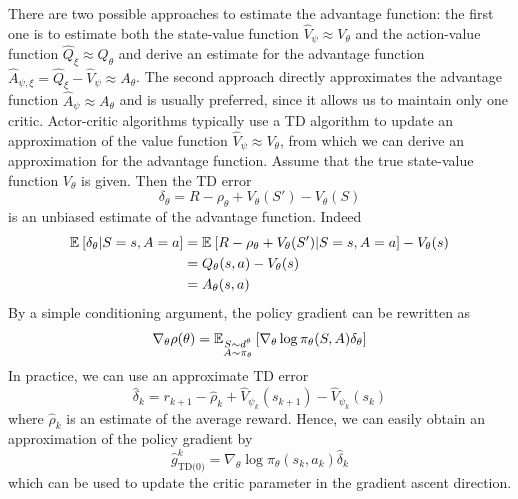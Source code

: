 There are two possible approaches to estimate the advantage function: the first one is to estimate both the state-value function $\widehat{V}_\psi \approx V_\theta$ and the action-value function $\widehat{Q}_\xi \approx Q_\theta$ and derive an estimate for the advantage function $\widehat{A}_{\psi, \xi} = \widehat{Q}_\xi - \widehat{V}_\psi \approx A_\theta$. The second approach directly approximates the advantage function $\widehat{A}_\psi \approx A_\theta$ and is usually preferred, since it allows us to maintain only one critic. Actor-critic algorithms typically use a \gls{TD} algorithm to update an approximation of the value function $\widehat{V}_\psi \approx V_\theta$, from which we can derive an approximation for the advantage function. Assume that the true state-value function $V_\theta$ is given. Then the \gls{TD} error 
\begin{equation}
	\delta_\theta = R - \rho_\theta + V_\theta(S') - V_\theta(S)
\end{equation}
is an unbiased estimate of the advantage function. Indeed 
\begin{equation*}
	\begin{split}
		\E{\delta_\theta | S = s, A = a} &= \E{R - \rho_\theta + V_\theta(S') | S = s, A = a} - V_\theta(s)\\
		&= Q_\theta(s,a) - V_\theta(s)\\
		&= A_\theta(s,a)  
	\end{split}
\end{equation*}
By a simple conditioning argument, the policy gradient can be rewritten as
\begin{equation}
	\nabla_\theta \rho(\theta) =
			\E[\substack{S \sim d^\theta\\A \sim \pi_\theta}]{\nabla_\theta\log
			\pi_\theta(S,A) \delta_\theta}
\end{equation} 
In practice, we can use an approximate \gls{TD} error 
\begin{equation}
\label{eq:td_error}
	\widehat{\delta}_k = r_{k+1} - \widehat{\rho}_k + \widehat{V}_{\psi_k}(s_{k+1}) - \widehat{V}_{\psi_k}(s_k) 
\end{equation}
where $\widehat{\rho}_k$ is an estimate of the average reward. Hence, we can easily obtain an approximation of the policy gradient by
\begin{equation}
	\widehat{g}_\text{TD(0)}^k = \nabla_\theta\log \pi_\theta(s_k,a_k) \widehat{\delta}_k
\end{equation}
which can be used to update the critic parameter in the gradient ascent direction. 
